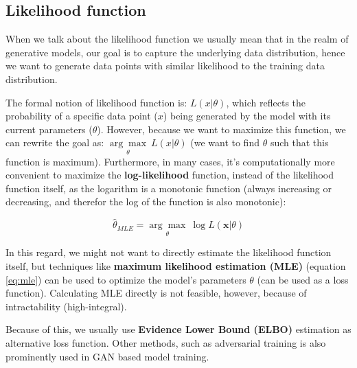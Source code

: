 \subsection{Likelihood function}
\label{appendix:likelihood_function}

When we talk about the likelihood function we usually mean that in the realm of generative models, our goal is to capture the underlying data distribution, hence we want to generate data points with similar likelihood to the training data distribution. 

The formal notion of likelihood function is: $L(x | \theta)$, which reflects the probability of a specific data point ($x$) being generated by the model with its current parameters ($\theta$). However, because we want to maximize this function, we can rewrite the goal as: $\underset{\theta}{\arg\max}\ L(x | \theta)$ (we want to find $\theta$ such that this function is maximum). Furthermore, in many cases, it's computationally more convenient to maximize the \textbf{log-likelihood} function, instead of the likelihood function itself, as the logarithm is a monotonic function (always increasing or decreasing, and therefor the log of the function is also monotonic):

\begin{equation}
\label{eq:mle}
    \hat{\theta}_{MLE} = \underset{\theta}{\arg\max} \ \log L(\mathbf{x} | \theta)
\end{equation}


In this regard, we might not want to directly estimate the likelihood function itself, but techniques like \textbf{maximum likelihood estimation (MLE)} (equation \ref{eq:mle}) can be used to optimize the model's parameters $\theta$ (can be used as a loss function). Calculating MLE directly is not feasible, however, because of intractability (high-integral).

Because of this, we usually use \textbf{Evidence Lower Bound (ELBO)} estimation as alternative loss function. Other methods, such as adversarial training is also prominently used in GAN based model training.
